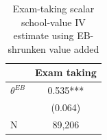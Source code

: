 \begin{table}[!htbp]
\centering
\caption{Exam-taking scalar school-value IV estimate using EB-shrunken value added}
\label{tab:scalar_school_value_iv_exam_taking_expected_va_eb}
\begin{tabular}{lc}
\toprule
 & Exam taking \\
\midrule
$\theta^{EB}$ & 0.535*** \\
 & (0.064) \\
N & 89,206 \\
\bottomrule
\end{tabular}
\end{table}
